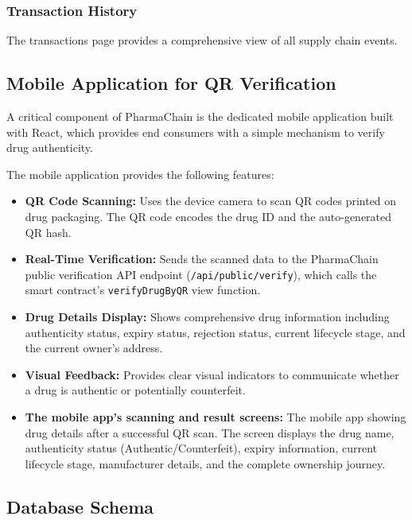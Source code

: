 \documentclass[conference]{IEEEtran}
\begin{document}
\subsubsection{Transaction History}

The transactions page provides a comprehensive view of all supply chain events.




\subsection{Mobile Application for QR Verification}

A critical component of PharmaChain is the dedicated mobile application built with React, which provides end consumers with a simple mechanism to verify drug authenticity.


The mobile application provides the following features:

\begin{itemize}
\item \textbf{QR Code Scanning:} Uses the device camera to scan QR codes printed on drug packaging. The QR code encodes the drug ID and the auto-generated QR hash.
\item \textbf{Real-Time Verification:} Sends the scanned data to the PharmaChain public verification API endpoint (\texttt{/api/public/verify}), which calls the smart contract's \texttt{verifyDrugByQR} view function.
\item \textbf{Drug Details Display:} Shows comprehensive drug information including authenticity status, expiry status, rejection status, current lifecycle stage, and the current owner's address.
\item \textbf{Visual Feedback:} Provides clear visual indicators to communicate whether a drug is authentic or potentially counterfeit.


\item \textbf{The mobile app's scanning and result screens: }The mobile app showing drug details after a successful QR scan. The screen displays the drug name, authenticity status (Authentic/Counterfeit), expiry information, current lifecycle stage, manufacturer details, and the complete ownership journey.



\end{itemize}


\subsection{Database Schema}
\end{document}
